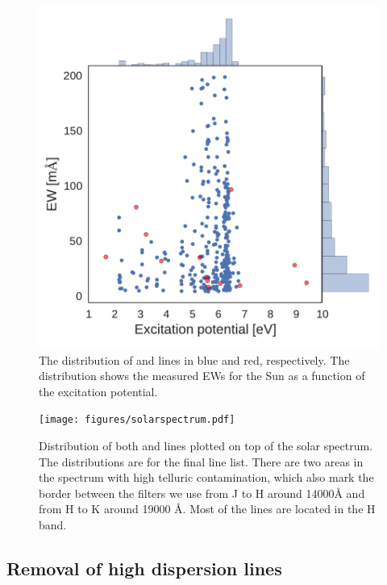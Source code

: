 \documentclass{aa}
\begin{document}
\begin{figure}[tpb]
    \centering
    \includegraphics[width=1.0\linewidth]{figures/EWvsEP.pdf}
    \caption{The distribution of  and  lines
    in  blue and red, respectively. The distribution shows the
    measured EWs for the Sun as a function of the excitation potential.}
    \label{fig:EWvsEP}
\end{figure}


\begin{figure}[tpb]
    \centering
    \texttt{[image: figures/solarspectrum.pdf]}
    \caption{Distribution of both  and  lines
    plotted on top of the solar spectrum. The distributions are for the final
    line list. There are two areas in the spectrum with high telluric
    contamination, which also mark the border between the filters we
    use from J to H around 14000\si{\angstrom} and from H to K around
    19000 \si{\angstrom}. Most of the lines are located in the H band.}
    \label{fig:solarspectrum}
\end{figure}


\subsection{Removal of high dispersion lines}
\label{sub:removal_of_unstable_lines}
\end{document}
